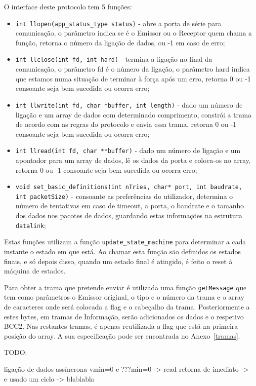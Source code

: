 \documentclass[11pt,a4paper,reqno]{report}
\numberwithin{equation}{section}
\begin{document}
O interface deste protocolo tem 5 funções:
\begin{itemize}
\item \verb|int llopen(app_status_type status)| - abre a porta de série para comunicação, o parâmetro indica se é o Emissor ou o Receptor quem chama a função, retorna o número da ligação de dados, ou -1 em caso de erro;
\item \verb|int llclose(int fd, int hard)| - termina a ligação no final da comunicação, o parâmetro fd é o número da ligação, o parâmetro hard indica que estamos numa situação de terminar à força após um erro, retorna 0 ou -1 consoante seja bem sucedida ou ocorra erro;
\item \verb|int llwrite(int fd, char *buffer, int length)| - dado um número de ligação e um array de dados com determinado comprimento, constrói a trama de acordo com as regras do protocolo e envia essa trama, retorna 0 ou -1 consoante seja bem sucedida ou ocorra erro;
\item \verb|int llread(int fd, char **buffer)| - dado um número de ligação e um apontador para um array de dados, lê os dados da porta e coloca-os no array, retorna 0 ou -1 consoante seja bem sucedida ou ocorra erro;
\item \verb|void set_basic_definitions(int nTries, char* port, int baudrate, int packetSize)| - consoante as preferências do utilizador, determina o número de tentativas em caso de timeout, a porta, o baudrate e o tamanho dos dados nos pacotes de dados, guardando estas informações na estrutura \verb|datalink|;
\end{itemize}

Estas funções utilizam a função \verb|update_state_machine| para determinar a cada instante o estado em que está. Ao chamar esta função são definidos os estados finais, e só depois disso, quando um estado final é atingido, é feito o reset à máquina de estados.

Para obter a trama que pretende enviar é utilizada uma função \verb|getMessage| que tem como parâmetros o Emissor original, o tipo e o número da trama e o array de caracteres onde será colocada a flag e o cabeçalho da trama. Posteriormente a estes bytes, em tramas de Informação, serão adicionados os dados e o respetivo BCC2. Nas restantes tramas, é apenas reutilizada a flag que está na primeira posição do array. A sua especificação pode ser encontrada no Anexo~\ref{tramas}. 

TODO:

ligação de dados assíncrona
vmin=0 e ???min=0 -> read retorna de imediato -> e usado um ciclo -> blablabla
\end{document}
